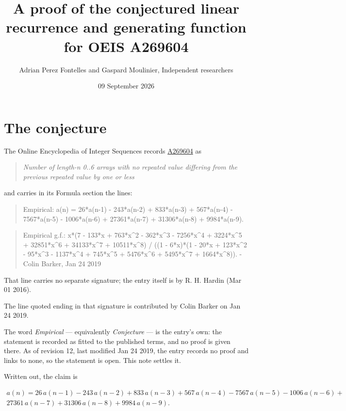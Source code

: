\documentclass[11pt]{article}
\title{A proof of the conjectured linear recurrence and generating function for OEIS A269604}
\author{Adrian Perez Fontelles and Gaspard Moulinier, Independent researchers}
\date{09 September 2026}
\theoremstyle{definition}
\begin{document}
\maketitle
\section{The conjecture}

The Online Encyclopedia of Integer Sequences records \href{https://oeis.org/A269604}{A269604} as

\begin{quote}\itshape Number of length-n 0..6 arrays with no repeated value differing from the previous repeated value by one or less\end{quote}

and carries in its Formula section the lines:

\begin{quote}\ttfamily Empirical: a(n) = 26*a(n-1) - 243*a(n-2) + 833*a(n-3) + 567*a(n-4) - 7567*a(n-5) - 1006*a(n-6) + 27361*a(n-7) + 31306*a(n-8) + 9984*a(n-9).\end{quote}

\begin{quote}\ttfamily Empirical g.f.: x*(7 - 133*x + 763*x\textasciicircum{}2 - 362*x\textasciicircum{}3 - 7256*x\textasciicircum{}4 + 3224*x\textasciicircum{}5 + 32851*x\textasciicircum{}6 + 34133*x\textasciicircum{}7 + 10511*x\textasciicircum{}8) / ((1 - 6*x)*(1 - 20*x + 123*x\textasciicircum{}2 - 95*x\textasciicircum{}3 - 1137*x\textasciicircum{}4 + 745*x\textasciicircum{}5 + 5476*x\textasciicircum{}6 + 5495*x\textasciicircum{}7 + 1664*x\textasciicircum{}8)). - Colin Barker, Jan 24 2019\end{quote}

That line carries no separate signature; the entry itself is by R. H. Hardin (Mar 01 2016).

The line quoted ending in that signature is contributed by Colin Barker on Jan 24 2019.

The word {\itshape Empirical} --- equivalently {\itshape Conjecture} --- is the entry's own: the statement is recorded as fitted to the published terms, and no proof is given there. As of revision 12, last modified Jan 24 2019, the entry records no proof and links to none, so the statement is open. This note settles it.

Written out, the claim is

\begin{multline*} a(n) = 26\,a(n-1) - 243\,a(n-2) + 833\,a(n-3) + 567\,a(n-4) - 7567\,a(n-5) - 1006\,a(n-6) + \\ 27361\,a(n-7) + 31306\,a(n-8) + 9984\,a(n-9). \end{multline*}
\end{document}
